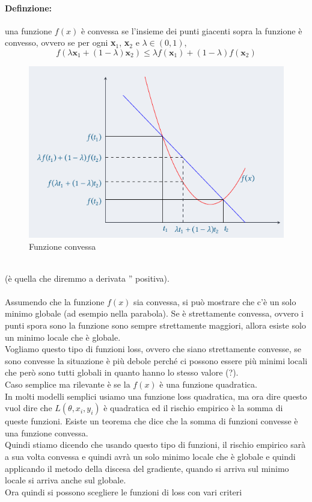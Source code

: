 \documentclass[12pt, oneside]{extbook}
\begin{document}
\paragraph{Definzione:}una funzione $f(x)$ è convessa se l'insieme dei punti giacenti sopra la funzione è convesso, ovvero se per ogni \textbf{x}$_1$, \textbf{x}$_2$ e $\lambda \in (0,1)$,
\begin{equation}
	f(\lambda\textbf{x}_1 + (1-\lambda)\textbf{x}_2) \leq \lambda f(\textbf{x}_1) + (1-\lambda)f(\textbf{x}_2)
\end{equation}
\begin{figure}[!h]
	\includegraphics[scale=0.5]{immagini/fun_conv.png}
	\caption{Funzione convessa}
\end{figure}\\
(è quella che diremmo a derivata '' positiva).\\\\Assumendo che la funzione $f(x)$ sia convessa, si può mostrare che c'è un solo minimo globale (ad esempio nella parabola). Se è strettamente convessa, ovvero i punti spora sono la funzione sono sempre strettamente maggiori, allora esiste solo un minimo locale che è globale.\\Vogliamo questo tipo di funzioni loss, ovvero che siano strettamente convesse, se sono convesse la situazione è più debole perché ci possono essere più minimi locali che però sono tutti globali in quanto hanno lo stesso valore (?).\\Caso semplice ma rilevante è se la $f(x)$ è una funzione quadratica.\\In molti modelli semplici usiamo una funzione loss quadratica, ma ora dire questo vuol dire che $L(\theta, x_i, y_i)$ è quadratica ed il rischio empirico è la somma di queste funzioni. Esiste un teorema che dice che la somma di funzioni convesse è una funzione convessa.\\Quindi stiamo dicendo che usando questo tipo di funzioni, il rischio empirico sarà a sua volta convessa e quindi avrà un solo minimo locale che è globale e quindi applicando il metodo della discesa del gradiente, quando si arriva sul minimo locale si arriva anche sul globale.\\Ora quindi si possono scegliere le funzioni di loss con vari criteri
\end{document}
